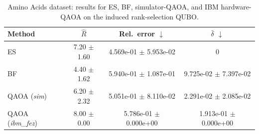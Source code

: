 \begin{table}[t]
\caption{Amino Acids dataset: results for ES, BF, simulator-QAOA, and IBM hardware-QAOA on the induced rank-selection QUBO.}
\label{tab:amino_metrics}
\centering
\scriptsize
\setlength{\tabcolsep}{5pt}
\renewcommand{\arraystretch}{1.05}
\begin{tabular}{@{}lccc@{}}
\toprule
Method & \(\hat{R}\) & Rel.\ error \(\downarrow\) & \(\bar{\delta}\) \(\downarrow\) \\
\midrule
ES                               & 7.20 $\pm$ 1.60 & 4.569e-01 $\pm$ 5.953e-02 & 0 \\
BF                               & 4.40 $\pm$ 1.62 & 5.940e-01 $\pm$ 1.087e-01 & 9.725e-02 $\pm$ 7.397e-02 \\
QAOA (\textit{sim})                       & 6.20 $\pm$ 2.32 & 5.051e-01 $\pm$ 8.110e-02 & 2.291e-02 $\pm$ 2.085e-02 \\
QAOA (\textit{ibm\_fez})                 & 8.00 $\pm$ 0.00 & 5.786e-01 $\pm$ 0.000e+00 & 1.913e-01 $\pm$ 0.000e+00 \\
\bottomrule
\end{tabular}
\end{table}
